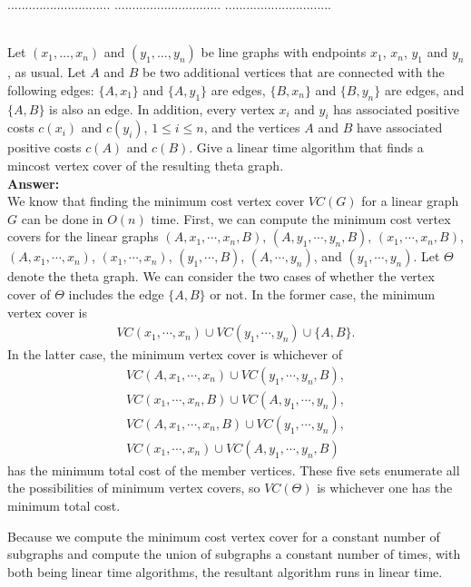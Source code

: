 \documentclass[a4paper,11pt]{article}
\begin{document}
\pagebreak
{} $.............................$
 $..............................$
          $..............................$\\

\bigskip
{}\\
Let $(x_1 , \ldots , x_n)$ and $(y_1 , \ldots , y_n )$ be line graphs with endpoints 
$x_1$, $x_n$, $y_1$ and $y_n$, as usual. 
Let $A$ and $B$ be two additional vertices that are connected with the following edges:
$\{ A , x_1 \}$ and $\{ A , y_1 \}$ are edges, $\{ B , x_n \}$ and $\{ B , y_n \}$ are edges, 
and $\{ A , B \}$ is also an edge. 
In addition, every vertex $x_i$ and $y_i$ has associated positive costs $c(x_i)$ and $c(y_i)$, $1 \leq i \leq n$, 
and the vertices $A$ and $B$ have associated positive costs $c(A)$ and $c(B)$. 
Give a linear time algorithm that finds a mincost vertex cover of the resulting theta graph.\\
{\bf Answer:}\\
We know that finding the minimum cost vertex cover $VC(G)$ for a linear graph $G$ can be done in $O(n)$ time. First, we can compute the minimum cost vertex covers for the linear graphs $(A, x_1, \cdots, x_n, B)$, $(A, y_1, \cdots, y_n, B)$, $(x_1, \cdots, x_n, B)$, $(A, x_1, \cdots, x_n)$, $(x_1, \cdots, x_{n})$, $(y_1, \cdots, B)$, $(A, \cdots, y_n)$, and $(y_1, \cdots, y_n)$. Let $\Theta$ denote the theta graph. We can consider the two cases of whether the vertex cover of $\Theta$ includes the edge $\{ A, B \}$ or not. In the former case, the minimum vertex cover is
\begin{align*}
    VC(x_1, \cdots, x_n) \cup VC(y_1, \cdots, y_n) \cup \{ A, B \}.
\end{align*}
In the latter case, the minimum vertex cover is whichever of
\begin{align*}
    VC(A, x_1, \cdots, x_n) \cup VC(y_1, \cdots, y_n, B), \\
    VC(x_1, \cdots, x_n, B) \cup VC(A, y_1, \cdots, y_n), \\
    VC(A, x_1, \cdots, x_n, B) \cup VC(y_1, \cdots, y_n), \\
    VC(x_1, \cdots, x_n) \cup VC(A, y_1, \cdots, y_n, B)
\end{align*}
has the minimum total cost of the member vertices. These five sets enumerate all the possibilities of minimum vertex covers, so $VC(\Theta)$ is whichever one has the minimum total cost. \par
Because we compute the minimum cost vertex cover for a constant number of subgraphs and compute the union of subgraphs a constant number of times, with both being linear time algorithms, the resultant algorithm runs in linear time.
\end{document}
